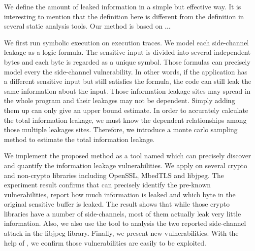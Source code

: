We define the amount of leaked information in a simple but effective way. It is interesting to 
mention that the definition here is different from the definition in several static analysis 
tools.
Our method is based on ... 

We first run symbolic execution on execution traces. We model each side-channel leakage as a logic formula. 
The sensitive input is divided into several independent bytes and each byte is regarded as 
a unique symbol. Those formulas can precisely model every the side-channel vulnerability. 
In other words, if the application has a different sensitive input but still satisfies the formula, 
the code can still leak the same information about the input.  
Those information leakage sites may spread in the whole program 
and their leakages may not be dependent. Simply adding them up can only give an upper bound 
estimate. In order to accurately calculate the total information leakage, we must know the 
dependent relationships among those multiple leakages sites. Therefore, we introduce a 
monte carlo sampling method to estimate the total information leakage.

We implement the proposed method as a tool named \tool{} which can precisely discover and quantify the information
leakage vulnerabilities. We apply \tool{} on several crypto and non-crypto libraries including OpenSSL,
MbedTLS and libjpeg. The experiment result confirms that \tool{} can precisely identify the pre-known vulnerabilities,
report how much information is leaked and which byte in the original sensitive buffer is leaked. 
The result shows that while those crypto libraries have a number of side-channels, most of them actually
leak very little information. Also, we also use the tool to analysis the two reported side-channel attack 
in the libjpeg library. Finally, we present new vulnerabilities. With the help of \tool{}, we confirm those
vulnerabilities are easily to be exploited.

